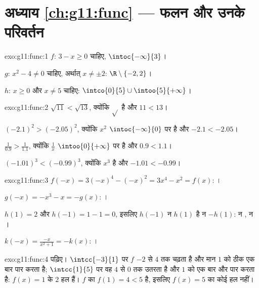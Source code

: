 \section*{अध्याय \ref{ch:g11:func} --- फलन और उनके परिवर्तन}

\begin{solution}{exo:g11:func:1}
$f$: $3 - x \geq 0$ चाहिए,  $\intoc{-\infty}{3}$।

$g$: $x^2 - 4 \neq 0$ चाहिए, अर्थात् $x \neq \pm 2$:  $\R \setminus \{-2, 2\}$।

$h$: $x \geq 0$ और $x \neq 5$ चाहिए:  $\intco{0}{5} \cup \intoo{5}{+\infty}$।
\end{solution}

\begin{solution}{exo:g11:func:2}
$\sqrt{11} < \sqrt{13}$, क्योंकि $\sqrt{}$  है और $11 < 13$।

$(-2.1)^2 > (-2.05)^2$, क्योंकि $x^2$ $\intoc{-\infty}{0}$ पर  है और $-2.1 < -2.05$।

$\frac{1}{0.9} > \frac{1}{1.1}$, क्योंकि $\frac1x$ $\intoo{0}{+\infty}$ पर  है और $0.9 < 1.1$।

$(-1.01)^3 < (-0.99)^3$, क्योंकि $x^3$  है और $-1.01 < -0.99$।
\end{solution}

\begin{solution}{exo:g11:func:3}
$f(-x) = 3(-x)^4 - (-x)^2 = 3x^4 - x^2 = f(x)$: ।

$g(-x) = -x^3 - x = -g(x)$: ।

$h(1) = 2$ और $h(-1) = 1 - 1 = 0$, इसलिए $h(-1)$ न $h(1)$ है न $-h(1)$: न , न ।

$k(-x) = \frac{-x}{x^2+1} = -k(x)$: ।
\end{solution}

\begin{solution}{exo:g11:func:4}
 पढ़िए। $\intcc{-3}{1}$ पर $f$ $-2$ से $4$ तक चढ़ता है और मान $1$ को
ठीक एक बार पार करता है; $\intcc{1}{5}$ पर वह $4$ से $0$ तक उतरता है और $1$ को एक
बार और पार करता है:  $f(x) = 1$ के $2$ हल हैं। $f$ का  $f(1) = 4 < 5$ है,
इसलिए $f(x) = 5$ का कोई हल नहीं।
\end{solution}

